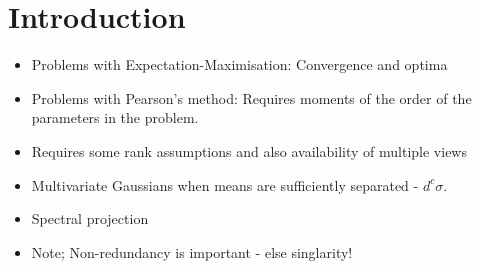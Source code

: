 \section{Introduction}
\label{sec:intro}


\begin{itemize}
\item Problems with Expectation-Maximisation: Convergence and optima
\item Problems with Pearson's method: Requires moments of the order of the parameters in the problem.
\item Requires some rank assumptions and also availability of multiple views
\item Multivariate Gaussians when means are sufficiently separated - $d^c \sigma$.
\item Spectral projection
\item Note; Non-redundancy is important - else singlarity!
\end{itemize}

